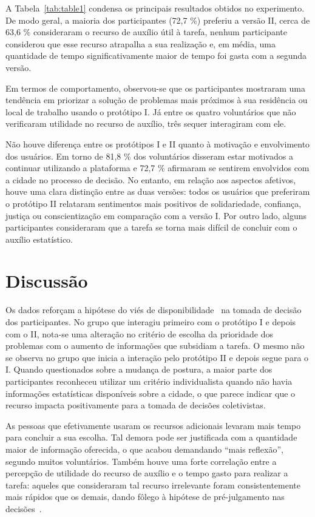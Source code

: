 \documentclass{sigchi}
\begin{document}
A Tabela~\ref{tab:table1} condensa os principais resultados obtidos no experimento. De modo geral, a maioria dos participantes (72,7 \%) preferiu a versão II, cerca de 63,6 \% consideraram o recurso de auxílio útil à tarefa, nenhum participante considerou que esse recurso atrapalha a sua realização e, em média, uma quantidade de tempo significativamente maior de tempo foi gasta com a segunda versão.

Em termos de comportamento, observou-se que os participantes mostraram uma tendência em priorizar a solução de problemas mais próximos à sua residência ou local de trabalho usando o protótipo I. Já entre os quatro voluntários que não verificaram utilidade no recurso de auxílio, três sequer interagiram com ele.

Não houve diferença entre os protótipos I e II quanto à motivação e envolvimento dos usuários. Em torno de 81,8 \% dos voluntários disseram estar motivados a continuar utilizando a plataforma e 72,7 \% afirmaram se sentirem envolvidos com a cidade no processo de decisão. No entanto, em relação aos aspectos afetivos, houve uma clara distinção entre as duas versões: todos os usuários que preferiram o protótipo II relataram sentimentos mais positivos de solidariedade, confiança, justiça ou conscientização em comparação com a versão I. Por outro lado, alguns participantes consideraram que a tarefa se torna mais difícil de concluir com o auxílio estatístico.


\section{Discussão}
Os dados reforçam a hipótese do viés de disponibilidade~\cite{tversky:1973} na tomada de decisão dos participantes. No grupo que interagiu primeiro com o protótipo I e depois com o II, nota-se uma alteração no critério de escolha da prioridade dos problemas com o aumento de informações que subsidiam a tarefa. O mesmo não se observa no grupo que inicia a interação pelo protótipo II e depois segue para o I. Quando questionados sobre a mudança de postura, a maior parte dos participantes reconheceu utilizar um critério individualista quando não havia informações estatísticas disponíveis sobre a cidade, o que parece indicar que o recurso impacta positivamente para a tomada de decisões coletivistas.

As pessoas que efetivamente usaram os recursos adicionais levaram mais tempo para concluir a sua escolha. Tal demora pode ser justificada com a quantidade maior de informação oferecida, o que acabou demandando ``mais reflexão'', segundo muitos voluntários. Também houve uma forte correlação entre a percepção de utilidade do recurso de auxílio e o tempo gasto para realizar a tarefa: aqueles que consideraram tal recurso irrelevante foram consistentemente mais rápidos que os demais, dando fôlego à hipótese de pré-julgamento nas decisões~\cite{tversky:1986}.
\end{document}
